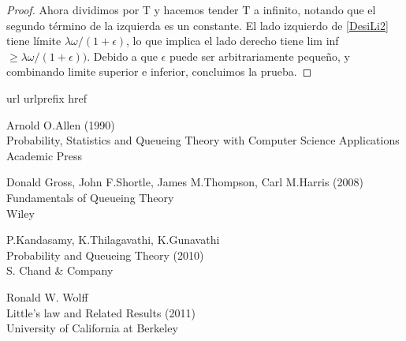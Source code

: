 \documentclass[a4paper,10pt]{scrartcl}
\theoremstyle{definition}
\numberwithin{equation}{section}
\begin{document}
\begin{proof}
Ahora dividimos por T y hacemos tender T a infinito, notando que el segundo término de la izquierda es un
constante. El lado izquierdo de \ref{DesiLi2} tiene límite $ \lambda\omega / (1 + \epsilon)$, lo que implica el lado derecho tiene lim inf $\geq \lambda\omega / (1 + \epsilon))$. Debido a que $\epsilon$ puede ser arbitrariamente pequeño, y combinando limite superior e inferior, concluimos la prueba.
\end{proof}


\newpage
\begin{thebibliography}{10}
  \expandafter\ifx\csname url\endcsname\relax
  \def\url#1{\texttt{#1}}\fi
  \expandafter\ifx\csname urlprefix\endcsname\relax\def\urlprefix{URL }\fi
  \expandafter\ifx\csname href\endcsname\relax
  \def\href#1#2{#2} \def\path#1{#1}\fi

  Arnold O.Allen (1990)\\
  Probability, Statistics and Queueing Theory with Computer Science Applications\\
  Academic Press

  Donald Gross, John F.Shortle, James M.Thompson, Carl M.Harris (2008)\\
  Fundamentals of Queueing Theory\\
  Wiley
  
  P.Kandasamy, K.Thilagavathi, K.Gunavathi\\
  Probability and Queueing Theory (2010)\\
  S. Chand \& Company

  Ronald W. Wolff\\
  Little's law and Related Results (2011)\\
  University of California at Berkeley
\end{thebibliography}
\end{document}
